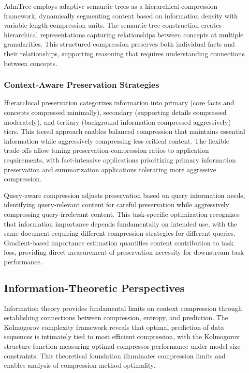 \documentclass[11pt,letterpaper]{article}
\begin{document}
AdmTree employs adaptive semantic trees as a hierarchical compression framework, dynamically segmenting content based on information density with variable-length compression units. The semantic tree construction creates hierarchical representations capturing relationships between concepts at multiple granularities. This structured compression preserves both individual facts and their relationships, supporting reasoning that requires understanding connections between concepts.

\subsubsection{Context-Aware Preservation Strategies}

Hierarchical preservation categorizes information into primary (core facts and concepts compressed minimally), secondary (supporting details compressed moderately), and tertiary (background information compressed aggressively) tiers. This tiered approach enables balanced compression that maintains essential information while aggressively compressing less critical content. The flexible trade-offs allow tuning preservation-compression ratios to application requirements, with fact-intensive applications prioritizing primary information preservation and summarization applications tolerating more aggressive compression.

Query-aware compression adjusts preservation based on query information needs, identifying query-relevant content for careful preservation while aggressively compressing query-irrelevant content. This task-specific optimization recognizes that information importance depends fundamentally on intended use, with the same document requiring different compression strategies for different queries. Gradient-based importance estimation quantifies content contribution to task loss, providing direct measurement of preservation necessity for downstream task performance.

\subsection{Information-Theoretic Perspectives}

Information theory provides fundamental limits on context compression through establishing connections between compression, entropy, and prediction. The Kolmogorov complexity framework reveals that optimal prediction of data sequences is intimately tied to most efficient compression, with the Kolmogorov structure function measuring optimal compressor performance under model-size constraints. This theoretical foundation illuminates compression limits and enables analysis of compression method optimality.
\end{document}

